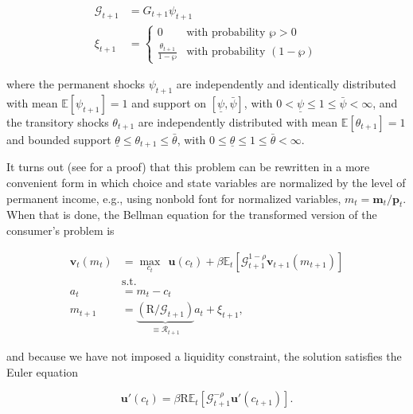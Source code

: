 \documentclass[twocolumn, switch]{article}
\newcommand{\CRRA}{\rho}
\newcommand{\cNrm}{c}
\newcommand{\uFunc}{\mathbf{u}}
\newcommand{\Ex}{\mathbf{\mathbb{E}}}
\newcommand{\DiscFac}{\beta}
\newcommand{\Rfree}{\text{R}}
\newcommand{\PermGroShk}{\mathcal{G}}
\newcommand{\tranShk}{\xi}
\newcommand{\mLvl}{\mathbf{m}}
\newcommand{\pLvl}{\mathbf{p}}
\newcommand{\PermGroFac}{G}
\newcommand{\permShk}{\psi}
\newcommand{\tranShkEmp}{\theta}
\newcommand{\WorstProb}{\wp}
\newcommand{\permShkMin}{\underline{\permShk}}
\newcommand{\permShkMax}{\bar{\permShk}}
\newcommand{\tranShkEmpMin}{\underline{\tranShkEmp}}
\newcommand{\tranShkEmpMax}{\bar{\tranShkEmp}}
\newcommand{\mNrm}{m}
\newcommand{\RNrmByG}{\mathcal{R}}
\newcommand{\aNrm}{a}
\newcommand{\vFunc}{\mathbf{v}}
\newcommand{\uPrime}{\uFunc'}
\begin{document}
\begin{equation}
\label{eq:ExogVars}
\begin{aligned}
\PermGroShk_{t+1} &= \PermGroFac_{t+1} \permShk_{t+1}  \\
\tranShk_{t+1} &= \begin{cases}
0 & \text{with probability } \WorstProb > 0 \\
\frac{\tranShkEmp_{t+1}}{1-\WorstProb} & \text{with probability } (1-\WorstProb)
\end{cases}
\end{aligned}
\end{equation}

where the permanent shocks $\permShk_{t+1}$ are independently and identically distributed with mean $\Ex[\permShk_{t+1}] = 1$ and support on $[\permShkMin, \permShkMax]$, with $0 < \permShkMin \leq 1 \leq \permShkMax < \infty$, and the transitory shocks $\tranShkEmp_{t+1}$ are independently distributed with mean $\Ex[\tranShkEmp_{t+1}] = 1$ and bounded support $\tranShkEmpMin \leq \tranShkEmp_{t+1} \leq \tranShkEmpMax$, with $0 \leq \tranShkEmpMin \leq 1 \leq \tranShkEmpMax < \infty$.

It turns out (see \citet{SolvingMicroDSOPs} for a proof) that this problem can
be rewritten in a more convenient form in which choice and state variables are
normalized by the level of permanent income, e.g., using nonbold font for normalized variables, $\mNrm_{t}=\mLvl_{t}/\pLvl_{t}$. When that is done, the
Bellman equation for the transformed version of the consumer's problem is

\begin{equation}
\label{eq:vNormed}
\begin{aligned}
\vFunc_{t}(\mNrm_{t}) &= \max_{\cNrm_{t}} ~~ \uFunc(\cNrm_{t})+\DiscFac \Ex_{t}[ \PermGroShk_{t+1}^{1-\CRRA}\vFunc_{t+1}(\mNrm_{t+1})] \\
&\text{s.t.} \\
\aNrm_{t} &= \mNrm_{t}-\cNrm_{t} \\
\mNrm_{t+1} &= \underbrace{\left(\Rfree/\PermGroShk_{t+1}\right)}_{\equiv \RNrmByG_{t+1}}\aNrm_{t}+\tranShk_{t+1},
\end{aligned}
\end{equation}

and because we have not imposed a liquidity constraint, the solution satisfies
the Euler equation

\begin{equation}
\label{eq:cEuler}
\uPrime(\cNrm_{t}) = \DiscFac \Rfree \Ex_{t}[ \PermGroShk_{t+1}^{-\CRRA} \uPrime(\cNrm_{t+1})].
\end{equation}
\end{document}

